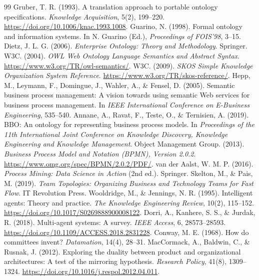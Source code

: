 \documentclass[11pt,letterpaper]{article}
\begin{document}
\begin{thebibliography}{99}
 Gruber, T. R. (1993). A translation approach to portable ontology specifications. \emph{Knowledge Acquisition}, 5(2), 199--220. \url{https://doi.org/10.1006/knac.1993.1008}.
 Guarino, N. (1998). Formal ontology and information systems. In N. Guarino (Ed.), \emph{Proceedings of FOIS'98}, 3--15.
 Dietz, J. L. G. (2006). \emph{Enterprise Ontology: Theory and Methodology}. Springer.
 W3C. (2004). \emph{OWL Web Ontology Language Semantics and Abstract Syntax}. \url{https://www.w3.org/TR/owl-semantics/}.
 W3C. (2009). \emph{SKOS Simple Knowledge Organization System Reference}. \url{https://www.w3.org/TR/skos-reference/}.
 Hepp, M., Leymann, F., Domingue, J., Wahler, A., \& Fensel, D. (2005). Semantic business process management: A vision towards using semantic Web services for business process management. In \emph{IEEE International Conference on E-Business Engineering}, 535--540.
 Annane, A., Ravat, F., Teste, O., \& Ternisien, A. (2019). BBO: An ontology for representing business process models. In \emph{Proceedings of the 11th International Joint Conference on Knowledge Discovery, Knowledge Engineering and Knowledge Management}.
 Object Management Group. (2013). \emph{Business Process Model and Notation (BPMN), Version 2.0.2}. \url{https://www.omg.org/spec/BPMN/2.0.2/PDF/}.
 van der Aalst, W. M. P. (2016). \emph{Process Mining: Data Science in Action} (2nd ed.). Springer.
 Skelton, M., \& Pais, M. (2019). \emph{Team Topologies: Organizing Business and Technology Teams for Fast Flow}. IT Revolution Press.
 Wooldridge, M., \& Jennings, N. R. (1995). Intelligent agents: Theory and practice. \emph{The Knowledge Engineering Review}, 10(2), 115--152. \url{https://doi.org/10.1017/S0269888900008122}.
 Dorri, A., Kanhere, S. S., \& Jurdak, R. (2018). Multi-agent systems: A survey. \emph{IEEE Access}, 6, 28573--28593. \url{https://doi.org/10.1109/ACCESS.2018.2831228}.
 Conway, M. E. (1968). How do committees invent? \emph{Datamation}, 14(4), 28--31.
 MacCormack, A., Baldwin, C., \& Rusnak, J. (2012). Exploring the duality between product and organizational architectures: A test of the mirroring hypothesis. \emph{Research Policy}, 41(8), 1309--1324. \url{https://doi.org/10.1016/j.respol.2012.04.011}.

\end{thebibliography}
\end{document}
